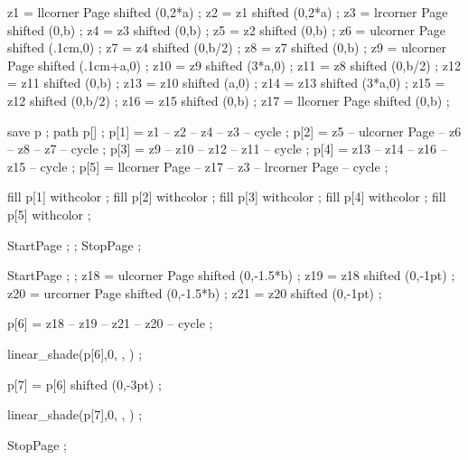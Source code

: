 z1 = llcorner Page shifted (0,2*a) ;
z2 = z1 shifted (0,2*a) ;
z3 = lrcorner Page shifted (0,b) ;
z4 = z3 shifted (0,b) ;
z5 = z2 shifted (0,b) ;
z6 = ulcorner Page  shifted (.1cm,0) ;
z7 = z4 shifted (0,b/2) ;
z8 = z7 shifted (0,b) ;
z9 = ulcorner Page shifted (.1cm+a,0) ;
z10 = z9 shifted (3*a,0) ;
z11 = z8 shifted (0,b/2) ;
z12 = z11 shifted (0,b) ;
z13 = z10 shifted (a,0) ;
z14 = z13 shifted (3*a,0) ;
z15 = z12 shifted (0,b/2) ;
z16 = z15 shifted (0,b) ;
z17 = llcorner Page shifted (0,b) ;

save p ;
path p[] ;
p[1] = z1 -- z2 -- z4 -- z3 -- cycle ;
p[2] = z5 -- ulcorner Page -- z6 -- z8 -- z7 -- cycle ;
p[3] = z9 -- z10 -- z12 -- z11 -- cycle ;
p[4] = z13 -- z14 -- z16 -- z15 -- cycle ;
p[5] = llcorner Page -- z17 -- z3 -- lrcorner Page -- cycle ;

fill p[1] withcolor  ;
fill p[2] withcolor  ;
fill p[3] withcolor  ;
fill p[4] withcolor  ;
fill p[5] withcolor  ;
\stopuseMPgraphic 

StartPage ;
 ;
StopPage ;
\stopuniqueMPgraphic

StartPage ;
 ;
z18 = ulcorner Page shifted (0,-1.5*b) ;
z19 = z18 shifted (0,-1pt) ;
z20 = urcorner Page shifted (0,-1.5*b) ;
z21 = z20 shifted (0,-1pt) ;

p[6] = z18 -- z19 -- z21 -- z20 -- cycle ;

linear_shade(p[6],0,
             ,
             ) ;

p[7] = p[6] shifted (0,-3pt) ;

linear_shade(p[7],0,
             ,
             ) ;

StopPage ;
\stopuniqueMPgraphic





